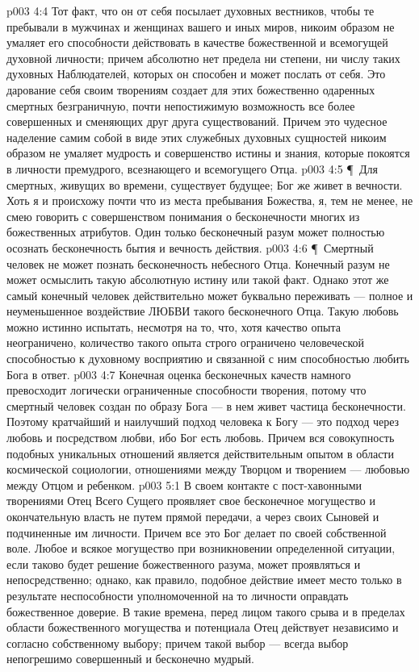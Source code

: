 \vs p003 4:4 Тот факт, что он от себя посылает духовных вестников, чтобы те пребывали в мужчинах и женщинах вашего и иных миров, никоим образом не умаляет его способности действовать в качестве божественной и всемогущей духовной личности; причем абсолютно нет предела ни степени, ни числу таких духовных Наблюдателей, которых он способен и может послать от себя. Это дарование себя своим творениям создает для этих божественно одаренных смертных безграничную, почти непостижимую возможность все более совершенных и сменяющих друг друга существований. Причем это чудесное наделение самим собой в виде этих служебных духовных сущностей никоим образом не умаляет мудрость и совершенство истины и знания, которые покоятся в личности премудрого, всезнающего и всемогущего Отца.
\vs p003 4:5 \P\ Для смертных, живущих во времени, существует будущее; Бог же живет в вечности. Хоть я и происхожу почти что из места пребывания Божества, я, тем не менее, не смею говорить с совершенством понимания о бесконечности многих из божественных атрибутов. Один только бесконечный разум может полностью осознать бесконечность бытия и вечность действия.
\vs p003 4:6 \P\ Смертный человек не может познать бесконечность небесного Отца. Конечный разум не может осмыслить такую абсолютную истину или такой факт. Однако этот же самый конечный человек действительно может  буквально переживать --- полное и неуменьшенное воздействие ЛЮБВИ такого бесконечного Отца. Такую любовь можно истинно испытать, несмотря на то, что, хотя качество опыта неограничено, количество такого опыта строго ограничено человеческой способностью к духовному восприятию и связанной с ним способностью любить Бога в ответ.
\vs p003 4:7 Конечная оценка бесконечных качеств намного превосходит логически ограниченные способности творения, потому что смертный человек создан по образу Бога --- в нем живет частица бесконечности. Поэтому кратчайший и наилучший подход человека к Богу --- это подход через любовь и посредством любви, ибо Бог есть любовь. Причем вся совокупность подобных уникальных отношений является действительным опытом в области космической социологии, отношениями между Творцом и творением --- любовью между Отцом и ребенком.
\vs p003 5:1 В своем контакте с пост\hyp{}хавонными творениями Отец Всего Сущего проявляет свое бесконечное могущество и окончательную власть не путем прямой передачи, а через своих Сыновей и подчиненные им личности. Причем все это Бог делает по своей собственной воле. Любое и всякое могущество при возникновении определенной ситуации, если таково будет решение божественного разума, может проявляться и непосредственно; однако, как правило, подобное действие имеет место только в результате неспособности уполномоченной на то личности оправдать божественное доверие. В такие времена, перед лицом такого срыва и в пределах области божественного могущества и потенциала Отец действует независимо и согласно собственному выбору; причем такой выбор --- всегда выбор непогрешимо совершенный и бесконечно мудрый.
